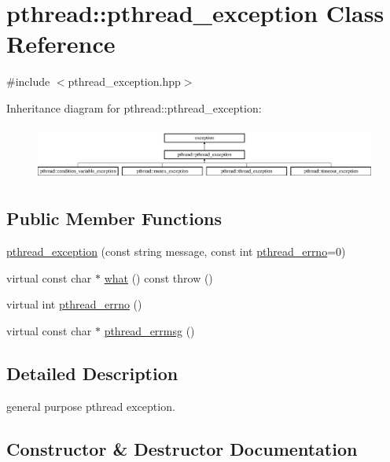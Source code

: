 \hypertarget{classpthread_1_1pthread__exception}{}\section{pthread\+:\+:pthread\+\_\+exception Class Reference}
\label{classpthread_1_1pthread__exception}


{\ttfamily \#include $<$pthread\+\_\+exception.\+hpp$>$}

Inheritance diagram for pthread\+:\+:pthread\+\_\+exception\+:\begin{figure}[H]
\begin{center}
\leavevmode
\includegraphics[height=1.794872cm]{classpthread_1_1pthread__exception}
\end{center}
\end{figure}
\subsection*{Public Member Functions}
\begin{DoxyCompactItemize}
\item 
\hyperlink{classpthread_1_1pthread__exception_a157d4379b6eddcc82ca504534c51abe6}{pthread\+\_\+exception} (const string message, const int \hyperlink{classpthread_1_1pthread__exception_a8a5c22a403ebd14635e912295fe02a1e}{pthread\+\_\+errno}=0)
\item 
virtual const char $\ast$ \hyperlink{classpthread_1_1pthread__exception_afaf1eff0f0fb8cf06412c6db0c3b5cd9}{what} () const   throw ()
\item 
virtual int \hyperlink{classpthread_1_1pthread__exception_a8a5c22a403ebd14635e912295fe02a1e}{pthread\+\_\+errno} ()
\item 
virtual const char $\ast$ \hyperlink{classpthread_1_1pthread__exception_aa2371eb23800817723174186450e9716}{pthread\+\_\+errmsg} ()
\end{DoxyCompactItemize}


\subsection{Detailed Description}
general purpose pthread exception. 

\subsection{Constructor \& Destructor Documentation}

